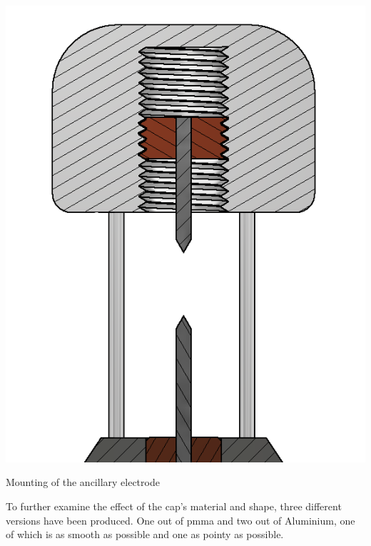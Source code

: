 \begin{marginfigure}[-3cm]
    \centering
    \includegraphics[width=\textwidth]{kassandra/resources/mirGehtsSuperDanke.png}
    \caption{Mounting of the ancillary electrode}
    \label{fig:ancillary-electrode}
\end{marginfigure}

To further examine the effect of the cap's material and shape, three different versions have been produced. One out of \gls{pmma} and two out of Aluminium, one of which is as smooth as possible and one as pointy as possible.

